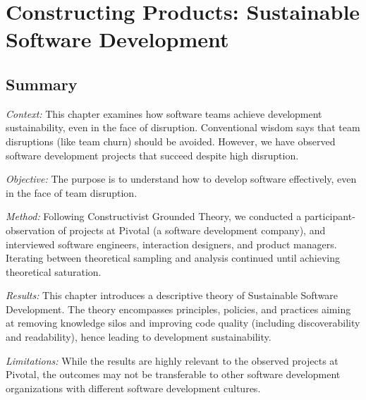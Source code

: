 \chapter{Constructing Products: Sustainable Software Development}
\label{SustainableSoftwareDevelopmentChapter}

\section{Summary}



\textit{Context:} This chapter examines how software teams achieve development sustainability, even in the face of disruption. Conventional wisdom says that team disruptions (like team churn) should be avoided. However, we have observed software development projects that succeed despite high disruption.

\textit{Objective:} The purpose is to understand how to develop software effectively, even in the face of team disruption.

\textit{Method:} Following Constructivist Grounded Theory, we conducted a \durationOfResearchStudyAdjective{} participant-observation of \numberOfObservedProjects{} projects at Pivotal (a software development company), and interviewed \numberOfInterviews{} software engineers, interaction designers, and product managers. Iterating between theoretical sampling and analysis continued until achieving theoretical saturation.

\textit{Results:} This chapter introduces a descriptive theory of Sustainable Software Development. The theory encompasses principles, policies, and practices aiming at removing knowledge silos and improving code quality (including discoverability and readability), hence leading to development sustainability. 

\textit{Limitations:} While the results are highly relevant to the observed projects at Pivotal, the outcomes may not be transferable to other software development organizations with different software development cultures.

